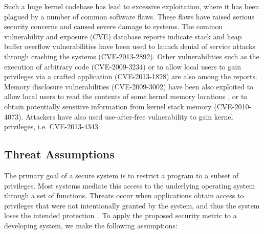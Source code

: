 Such a huge kernel codebase has lead to excessive exploitation, where it has
been plagued by a number of common software flaws.
These flaws have raised serious security concerns and caused severe damage
to systems. The common vulnerability and exposure (CVE) database
reports indicate stack and heap buffer overflow vulnerabilities
have been used to launch denial of service attacks through crashing the systems
 (CVE-2013-2892).
Other vulnerabilities such as the execution of arbitrary code (CVE-2009-3234)
or to allow local users to gain privileges via a crafted
application (CVE-2013-1828) are also among the reports.
Memory disclosure vulnerabilities (CVE-2009-3002) have been also exploited to allow local users
to read
the contents of some kernel memory locations
, or to obtain potentially sensitive information from kernel stack memory (CVE-2010-4073).
Attackers have also used use-after-free vulnerability to gain kernel
privileges, i.e. CVE-2013-4343.


\subsection{Threat Assumptions}

The primary goal of a secure system is to restrict a program to a subset
of privileges. Most systems mediate this access to the underlying operating
system through a set of functions.
Threats occur when applications obtain access to privileges that were not
intentionally granted by the system, and thus the system loses the intended
protection~\cite{Repy-10}.
To apply the proposed security metric to a developing  system,
we make the following assumptions:

